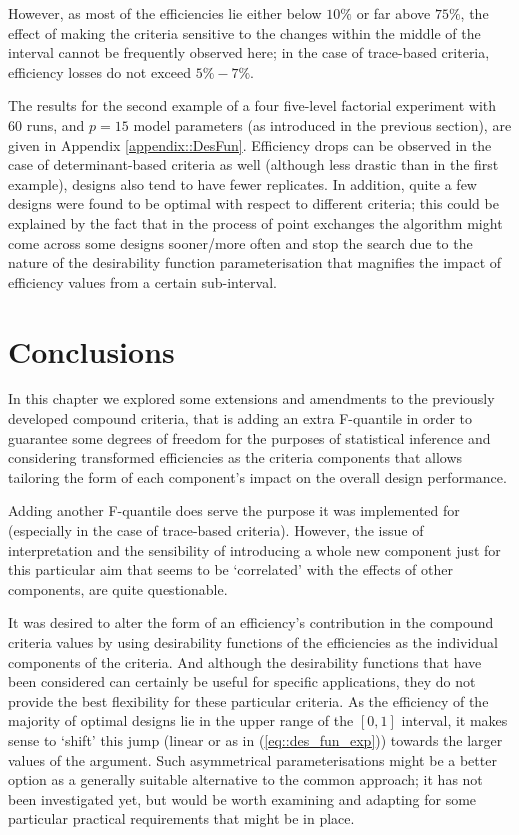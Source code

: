 However, as most of the efficiencies lie either below $10\%$ or far above $75\%$, the effect of making the criteria sensitive to the changes within the middle of the interval cannot be frequently observed here; in the case of trace-based criteria, efficiency losses do not exceed $5\%-7\%$.

The results for the second example of a four five-level factorial experiment with $60$ runs, and $p=15$ model parameters (as introduced in the previous section), are given in Appendix \ref{appendix::DesFun}. Efficiency drops can be observed in the case of determinant-based criteria as well (although less drastic than in the first example), designs also tend to have fewer replicates. In addition, quite a few designs were found to be optimal with respect to different criteria; this could be explained by the fact that in the process of point exchanges the algorithm might come across some designs sooner/more often and stop the search due to the nature of the desirability function parameterisation that magnifies the impact of efficiency values from a certain sub-interval.


\section{Conclusions}
In this chapter we explored some extensions and amendments to the previously developed compound criteria, that is adding an extra F-quantile in order to guarantee some degrees of freedom for the purposes of statistical inference and considering transformed efficiencies as the criteria components that allows tailoring the form of each component's impact on the overall design performance.

Adding another F-quantile does serve the purpose it was implemented for (especially in the case of trace-based criteria). However, the issue of interpretation and the sensibility of introducing a whole new component just for this particular aim that seems to be `correlated' with the effects of other components, are quite questionable. 

It was desired to alter the form of an efficiency's contribution in the compound criteria values by using desirability functions of the efficiencies as the individual components of the criteria. And although the desirability functions that have been considered can certainly be useful for specific applications, they do not provide the best flexibility for these particular criteria. As the efficiency of the majority of optimal designs lie in the upper range of the $[0,1]$ interval, it makes sense to `shift' this jump (linear or as in (\ref{eq::des_fun_exp})) towards the larger values of the argument. Such asymmetrical parameterisations might be a better option as a generally suitable alternative to the common approach; it has not been investigated yet, but would be worth examining and adapting for some particular practical requirements that might be in place.   